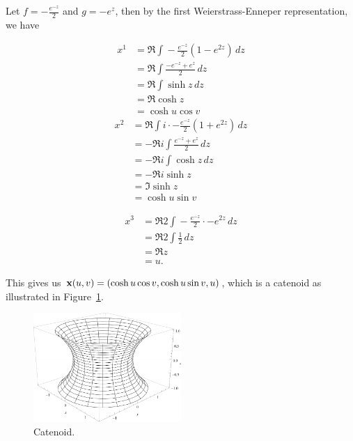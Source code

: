   \newcommand{\zint}[2]{\Re#1\int\!#2\,dz}
  \begin{ex}
    \label{ex:catenoid}
    Let $f = -\frac{e^{-z}}{2}$ and $g = -e^z$, then by the first Weierstrass-Enneper representation, we have
    \begin{multicols}{2}
      \begin{align*}
        x^1 &= \zint{}{-\frac{e^{-z}}{2}\left(1 - e^{2z}\right)}\\
        &= \zint{}{\frac{-e^{-z} + e^z}{2}}\\
        &= \zint{}{\sinh z}\\
        &= \Re\cosh z\\
        &= \cosh u \cos v
      \end{align*}\break
      \begin{align*}
        x^2 &= \zint{}{i\cdot-\frac{e^{-z}}{2}\left(1 + e^{2z}\right)}\\
        &= -\zint{i}{\frac{e^{-z} + e^z}{2}}\\
        &= -\zint{i}{\cosh z}\\
        &= -\Re i\sinh z\\
        &= \Im \sinh z\\
        &= \cosh u \sin v
      \end{align*}
    \end{multicols}
    \begin{align*}
      x^3 &= \zint{2}{-\frac{e^{-z}}{2}\cdot -e^{2z}}\\
      &= \zint{2}{\frac{1}{2}}\\
      &= \Re z\\
      &= u.
    \end{align*}

    This gives us $\mathbf{x}(u, v) = (\cosh u \cos v, \cosh u \sin v, u)$, which is a catenoid as illustrated in Figure~\ref{fig:catenoid}.
    \begin{figure} %
      \centering
      \includegraphics[width=0.5\textwidth]{figures/catenoid.pdf}
      \caption{Catenoid.}
      \label{fig:catenoid}
    \end{figure}
  \end{ex}

